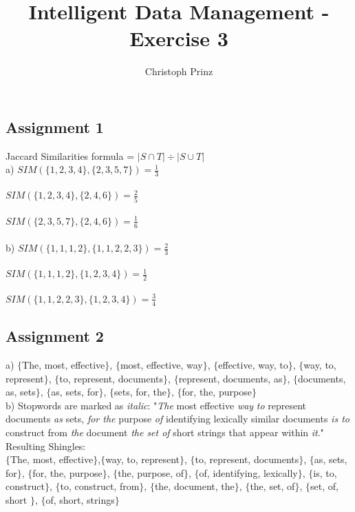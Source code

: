 \documentclass[]{scrartcl}
\title{Intelligent Data Management - Exercise 3}
\author{Christoph Prinz}
\begin{document}
\maketitle

\subsection*{Assignment 1}

Jaccard Similarities formula = $|S \cap T| \div |S \cup T|$ \\

a) $SIM(\{1, 2, 3, 4\}, \{2, 3, 5, 7\}) = \frac{1}{3}$\\\\
$SIM(\{1, 2, 3, 4\},\{2, 4, 6\}) = \frac{2}{5}$\\\\
$SIM(\{2, 3, 5, 7\}, \{2, 4, 6\}) = \frac{1}{6}$\\\\

b) $SIM(\{1, 1, 1, 2\}, \{1, 1, 2, 2, 3\}) = \frac{2}{3}$\\\\
$SIM(\{1, 1, 1, 2\}, \{1, 2, 3, 4\}) = \frac{1}{2}$\\\\
$SIM(\{1, 1, 2, 2, 3\}, \{1, 2, 3, 4\}) = \frac{3}{4}$\\

\subsection*{Assignment 2}

a) $\{$The, most, effective$\}$, $\{$most, effective, way$\}$, $\{$effective, way, to$\}$, $\{$way, to, represent$\}$, $\{$to, represent, documents$\}$, $\{$represent, documents, as$\}$, $\{$documents, as, sets$\}$, $\{$as, sets, for$\}$, $\{$sets, for, the$\}$, $\{$for, the, purpose$\}$ \\


b) Stopwords are marked as \textit{italic}: "\textit{The} most effective \textit{way} \textit{to} represent documents \textit{as} sets,\textit{ for the} purpose \textit{of} identifying lexically similar documents \textit{is to} construct from \textit{the} document \textit{the set of} short strings that appear within \textit{it}."\\

Resulting Shingles:\\

$\{$The, most, effective$\}$,$\{$way, to, represent$\}$, $\{$to, represent, documents$\}$, $\{$as, sets, for$\}$, $\{$for, the, purpose$\}$, $\{$the, purpose, of$\}$, $\{$of, identifying, lexically$\}$, $\{$is, to, construct$\}$, $\{$to, construct, from$\}$, $\{$the, document, the$\}$, $\{$the, set, of$\}$, $\{$set, of, short $\}$, $\{$of, short, strings$\}$
\end{document}

